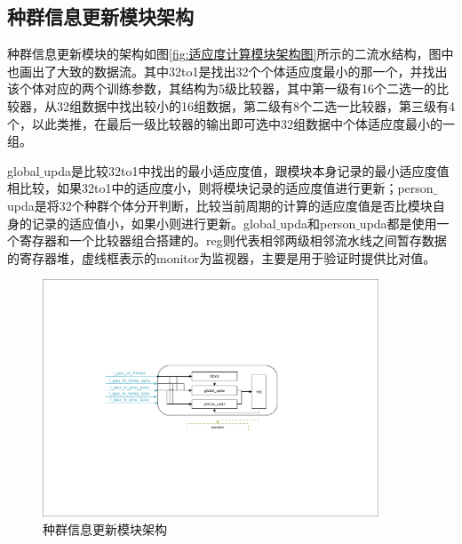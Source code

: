 \subsection{种群信息更新模块架构}
种群信息更新模块的架构如图\ref{fig:适应度计算模块架构图}所示的二流水结构，图中也画出了大致的数据流。其中32to1是找出32个个体适应度最小的那一个，并找出该个体对应的两个训练参数，其结构为5级比较器，其中第一级有16个二选一的比较器，从32组数据中找出较小的16组数据，第二级有8个二选一比较器，第三级有4个，以此类推，在最后一级比较器的输出即可选中32组数据中个体适应度最小的一组。

global$\_$upda是比较32to1中找出的最小适应度值，跟模块本身记录的最小适应度值相比较，如果32to1中的适应度小，则将模块记录的适应度值进行更新；person$\_$upda是将32个种群个体分开判断，比较当前周期的计算的适应度值是否比模块自身的记录的适应值小，如果小则进行更新。global$\_$upda和person$\_$upda都是使用一个寄存器和一个比较器组合搭建的。reg则代表相邻两级相邻流水线之间暂存数据的寄存器堆，虚线框表示的monitor为监视器，主要是用于验证时提供比对值。


\begin{figure}[htb]
    \centering
    \includegraphics[width=10cm]{fig/5-fig/种群信息更新模块架构.pdf}
    \caption{种群信息更新模块架构}
    \label{fig:种群信息更新模块架构}
\end{figure}

